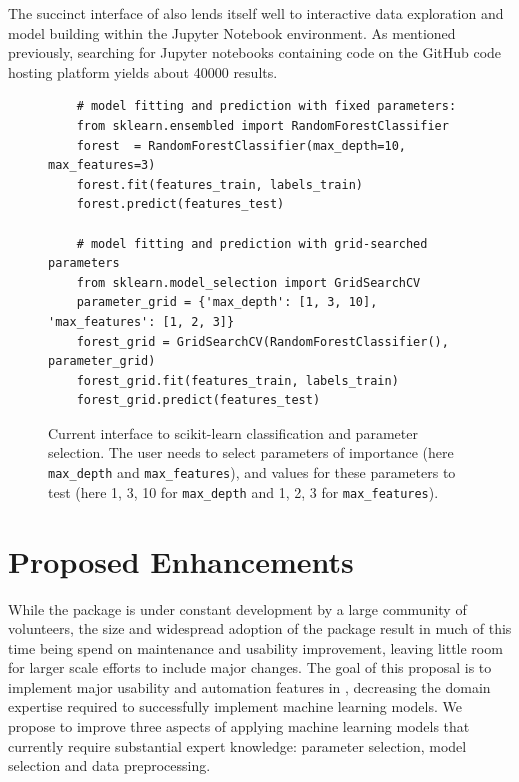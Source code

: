 The succinct interface of \sklearn{} also lends itself well to interactive
data exploration and model building within the Jupyter Notebook environment.
As mentioned previously, searching for Jupyter notebooks containing
\sklearn{} code on the GitHub code hosting platform yields about 40000
results.

\begin{figure}
    \begin{verbatim}
    # model fitting and prediction with fixed parameters:
    from sklearn.ensembled import RandomForestClassifier
    forest  = RandomForestClassifier(max_depth=10, max_features=3)
    forest.fit(features_train, labels_train)
    forest.predict(features_test)

    # model fitting and prediction with grid-searched parameters
    from sklearn.model_selection import GridSearchCV
    parameter_grid = {'max_depth': [1, 3, 10], 'max_features': [1, 2, 3]}
    forest_grid = GridSearchCV(RandomForestClassifier(), parameter_grid)
    forest_grid.fit(features_train, labels_train)
    forest_grid.predict(features_test)
    \end{verbatim}
    \vspace{-5mm}
    \label{gridsearch}
    \caption{Current interface to scikit-learn classification and parameter
        selection. The user needs to select parameters of importance (here
        \texttt{max\_depth} and \texttt{max\_features}), and values for these
        parameters to test (here 1, 3, 10 for \texttt{max\_depth} and 1, 2, 3
        for \texttt{max\_features}).}
\end{figure}

\section{Proposed Enhancements}
While the \sklearn{} package is under constant development by a large community
of volunteers, the size and widespread adoption of the package result in much of this
time being spend on maintenance and usability improvement, leaving little room
for larger scale efforts to include major changes. The goal of this proposal
is to implement major usability and automation features in \sklearn{}, decreasing
the domain expertise required to successfully implement machine learning models.
We propose to improve three aspects of applying machine learning models that
currently require substantial expert knowledge: parameter selection, model
selection and data preprocessing.

